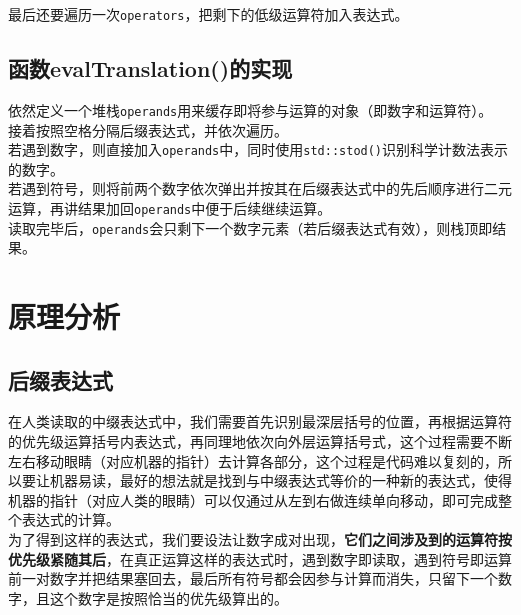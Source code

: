 \documentclass[UTF8]{ctexart}
\begin{document}
最后还要遍历一次\verb|operators|，把剩下的低级运算符加入表达式。

\subsection{函数evalTranslation()的实现}
依然定义一个堆栈\verb|operands|用来缓存即将参与运算的对象（即数字和运算符）。\\
接着按照空格分隔后缀表达式，并依次遍历。\\
若遇到数字，则直接加入\verb|operands|中，同时使用\verb|std::stod()|识别科学计数法表示的数字。\\
若遇到符号，则将前两个数字依次弹出并按其在后缀表达式中的先后顺序进行二元运算，再讲结果加回\verb|operands|中便于后续继续运算。\\
读取完毕后，\verb|operands|会只剩下一个数字元素（若后缀表达式有效），则栈顶即结果。

\section{原理分析}
\subsection{后缀表达式}
在人类读取的中缀表达式中，我们需要首先识别最深层括号的位置，再根据运算符的优先级运算括号内表达式，再同理地依次向外层运算括号式，这个过程需要不断左右移动眼睛（对应机器的指针）去计算各部分，这个过程是代码难以复刻的，所以要让机器易读，最好的想法就是找到与中缀表达式等价的一种新的表达式，使得机器的指针（对应人类的眼睛）可以仅通过从左到右做连续单向移动，即可完成整个表达式的计算。\\
为了得到这样的表达式，我们要设法让数字成对出现，\textbf{它们之间涉及到的运算符按优先级紧随其后}，在真正运算这样的表达式时，遇到数字即读取，遇到符号即运算前一对数字并把结果塞回去，最后所有符号都会因参与计算而消失，只留下一个数字，且这个数字是按照恰当的优先级算出的。\\
\end{document}
